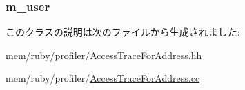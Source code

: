 \label{classAccessTraceForAddress_a4949c45d0cddbcbbefb81cc89c85cf17}
\hypertarget{classAccessTraceForAddress_a4050103e54b773a2c5905995b437c5cf}{
\subsubsection[{m\_\-user}]{ {\bf m\_\-user}}}
\label{classAccessTraceForAddress_a4050103e54b773a2c5905995b437c5cf}


このクラスの説明は次のファイルから生成されました:\begin{DoxyCompactItemize}
\item 
mem/ruby/profiler/\hyperlink{AccessTraceForAddress_8hh}{AccessTraceForAddress.hh}\item 
mem/ruby/profiler/\hyperlink{AccessTraceForAddress_8cc}{AccessTraceForAddress.cc}\end{DoxyCompactItemize}
